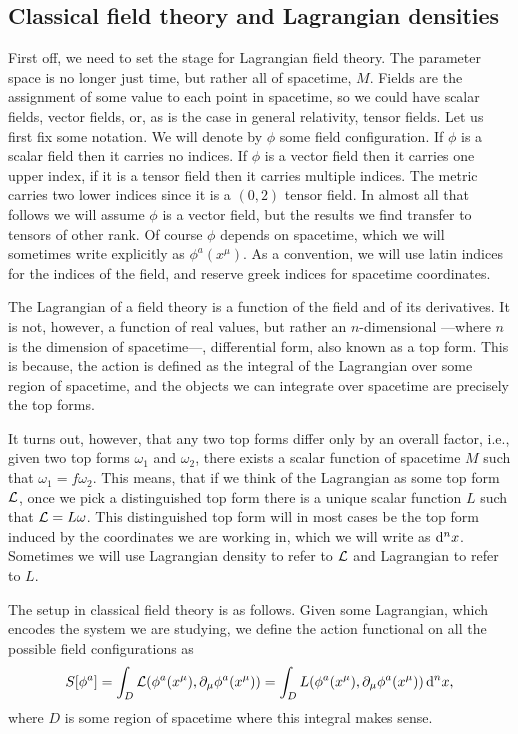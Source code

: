\documentclass[../main.tex]{subfiles}
\begin{document}
\subsection{Classical field theory and Lagrangian densities}\label{sec:lagrangian
densities}
First off, we need to set the stage for Lagrangian field theory. The parameter space is no
longer just time, but rather all of spacetime, \( M \). Fields are the assignment of some
value to each point in spacetime, so we could have scalar fields, vector fields, or, as is
the case in general relativity, tensor fields. Let us first fix some notation. We will
denote by \( \phi \) some field configuration. If \( \phi \) is a scalar field then it
carries no indices. If \( \phi \) is a vector field then it carries one upper index, if it is a
tensor field then it carries multiple indices. The metric carries two lower indices since
it is a \( (0,2) \) tensor field. In almost all that follows we will assume \( \phi \) is
a vector field, but the results we find transfer to tensors of other rank. Of
course \( \phi \) depends on spacetime, which we will sometimes write explicitly as \(
\phi^a(x^\mu) \). As a convention, we will use latin indices for the indices of the field,
and reserve greek indices for spacetime coordinates. 

The Lagrangian of a field theory is a function of the field and of its derivatives.
It is not, however, a function of real values, but rather an \( n \)-dimensional ---where
\( n \) is the dimension of spacetime---, differential form, also known as a top form.
This is because, the action is defined as the integral of the Lagrangian over some region
of spacetime, and the objects we can integrate over spacetime are precisely the top forms.

It turns out, however, that any two top forms differ only by an overall factor, i.e., given two
top forms \( \omega_1 \) and \( \omega_2 \), there exists a scalar function of spacetime
\( M \) such that \( \omega_1 = f\omega_2 \). This means, that if we think of the
Lagrangian as some top form \( \mathcal{L} \), once we pick a distinguished top form there is a
unique scalar function \( L \) such that \( \mathcal{L} = L \omega \). This distinguished top form
will in most cases be the top form induced by the coordinates we are working in, which we
will write as \( \mathrm{d}^nx \). Sometimes we will use Lagrangian density to refer to \( \mathcal{L} \)
and Lagrangian to refer to \( L \). 

The setup in classical field theory is as follows. Given some Lagrangian, which encodes
the system we are studying, we define the action functional on all the possible field
configurations as 
\begin{equation*}
	S[\phi^a] = \int_D \mathcal{L}(\phi^a(x^\mu), \partial_\mu \phi^a(x^\mu)) = \int_D
	L(\phi^a(x^\mu), \partial_\mu \phi^a(x^\mu)) \,\mathrm{d}^n x,
\end{equation*}
where \( D \) is some region of spacetime where this integral makes sense. 
\end{document}
